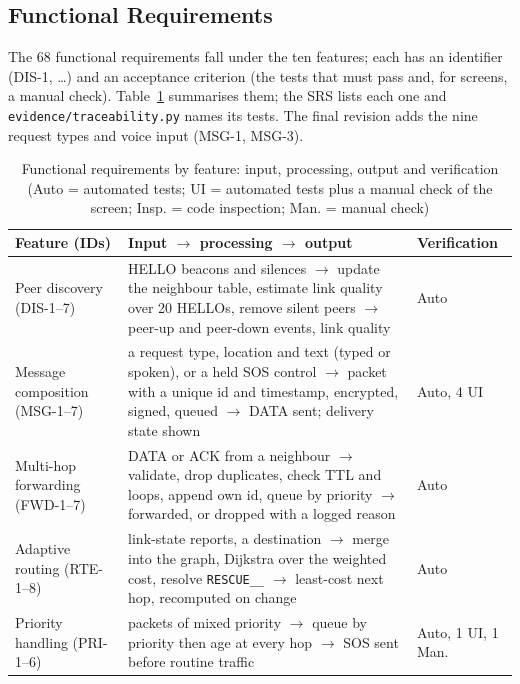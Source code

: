 \subsection{Functional Requirements}
\label{sec:fr}
The 68 functional requirements fall under the ten features; each has an identifier (DIS-1, \ldots) and an acceptance criterion (the tests that must pass and, for screens, a manual check). Table~\ref{tab:frsum} summarises them; the SRS lists each one and \texttt{evidence/traceability.py} names its tests. The final revision adds the nine request types and voice input (MSG-1, MSG-3).
\begin{table}[!htbp]
\caption[Functional requirements by feature]{Functional requirements by feature: input, processing, output and verification (Auto = automated tests; UI = automated tests plus a manual check of the screen; Insp. = code inspection; Man. = manual check)}
\label{tab:frsum}
\footnotesize
\setlength{\tabcolsep}{4pt}
\begin{tabularx}{\textwidth}{@{}>{\raggedright\arraybackslash}p{2.35cm}>{\raggedright\arraybackslash}X>{\raggedright\arraybackslash}p{2.45cm}@{}}
\toprule
\textbf{Feature (IDs)} & \textbf{Input $\rightarrow$ processing $\rightarrow$ output} & \textbf{Verification}\\ \midrule
Peer discovery (DIS-1--7) & HELLO beacons and silences $\rightarrow$ update the neighbour table, estimate link quality over 20 HELLOs, remove silent peers $\rightarrow$ peer-up and peer-down events, link quality & 7 Auto\\
Message composition (MSG-1--7) & a request type, location and text (typed or spoken), or a held SOS control $\rightarrow$ packet with a unique id and timestamp, encrypted, signed, queued $\rightarrow$ DATA sent; delivery state shown & 3 Auto, 4 UI\\
Multi-hop forwarding (FWD-1--7) & DATA or ACK from a neighbour $\rightarrow$ validate, drop duplicates, check TTL and loops, append own id, queue by priority $\rightarrow$ forwarded, or dropped with a logged reason & 7 Auto\\
Adaptive routing (RTE-1--8) & link-state reports, a destination $\rightarrow$ merge into the graph, Dijkstra over the weighted cost, resolve \texttt{RESCUE\_\_} $\rightarrow$ least-cost next hop, recomputed on change & 8 Auto\\
Priority handling (PRI-1--6) & packets of mixed priority $\rightarrow$ queue by priority then age at every hop $\rightarrow$ SOS sent before routine traffic & 4 Auto, 1 UI, 1 Man.\\

\end{tabularx}
\end{table}
